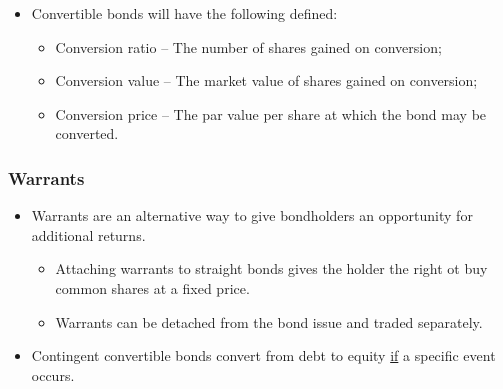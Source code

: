 \documentclass[../notes_compiled.tex]{subfiles}
\begin{document}
\begin{itemize}
\begin{figure}[H]
  \caption{Diagram showing convertible bond behaviour based on stock price}
\end{figure}
\vspace{-.5cm}
\item[] Convertible bonds will have the following defined:
\begin{itemize}
\item Conversion ratio -- The number of shares gained on conversion;
\item Conversion value -- The market value of shares gained on conversion;
\item Conversion price -- The par value per share at which the bond may be converted.
\end{itemize}
\end{itemize}


\subsubsection{Warrants}
\begin{itemize}
\item Warrants are an alternative way to give bondholders an opportunity for additional returns.
\begin{itemize}
\item Attaching warrants to straight bonds gives the holder the right ot buy common shares at a fixed price.
\item Warrants can be detached from the bond issue and traded separately.
\end{itemize}
\item Contingent convertible bonds convert from debt to equity \underline{if} a specific event occurs.
\end{itemize}
\end{document}
